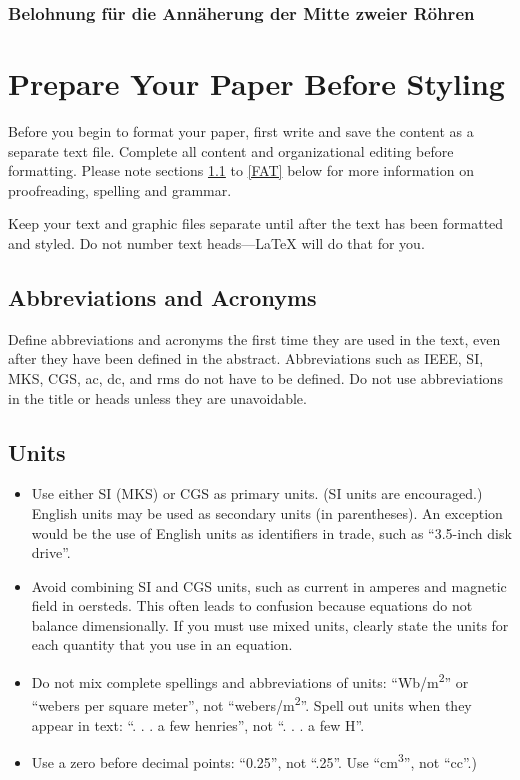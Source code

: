 \documentclass[conference]{IEEEtran}
\begin{document}
\subsubsection{Belohnung für die Annäherung der Mitte zweier Röhren}\label{reward_shaping_second}

\section{Prepare Your Paper Before Styling}
Before you begin to format your paper, first write and save the content as a 
separate text file. Complete all content and organizational editing before 
formatting. Please note sections \ref{AA} to \ref{FAT} below for more information on 
proofreading, spelling and grammar.

Keep your text and graphic files separate until after the text has been 
formatted and styled. Do not number text heads---{\LaTeX} will do that 
for you.

\subsection{Abbreviations and Acronyms}\label{AA}
Define abbreviations and acronyms the first time they are used in the text, 
even after they have been defined in the abstract. Abbreviations such as 
IEEE, SI, MKS, CGS, ac, dc, and rms do not have to be defined. Do not use 
abbreviations in the title or heads unless they are unavoidable.

\subsection{Units}
\begin{itemize}
\item Use either SI (MKS) or CGS as primary units. (SI units are encouraged.) English units may be used as secondary units (in parentheses). An exception would be the use of English units as identifiers in trade, such as ``3.5-inch disk drive''.
\item Avoid combining SI and CGS units, such as current in amperes and magnetic field in oersteds. This often leads to confusion because equations do not balance dimensionally. If you must use mixed units, clearly state the units for each quantity that you use in an equation.
\item Do not mix complete spellings and abbreviations of units: ``Wb/m\textsuperscript{2}'' or ``webers per square meter'', not ``webers/m\textsuperscript{2}''. Spell out units when they appear in text: ``. . . a few henries'', not ``. . . a few H''.
\item Use a zero before decimal points: ``0.25'', not ``.25''. Use ``cm\textsuperscript{3}'', not ``cc''.)
\end{itemize}
\end{document}
